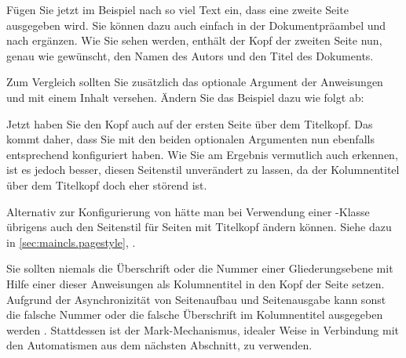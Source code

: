 \begin{Example}
  Fügen Sie jetzt im Beispiel nach  so viel
  Text ein, dass eine zweite Seite ausgegeben wird. Sie können dazu auch
  einfach  in der
  Dokumentpräambel und  nach
   ergänzen. Wie Sie sehen werden, enthält der
  Kopf der zweiten Seite nun, genau wie gewünscht, den Namen des Autors und
  den Titel des Dokuments.

  Zum Vergleich sollten Sie zusätzlich das optionale Argument der Anweisungen
   und  mit einem Inhalt versehen. Ändern Sie das
  Beispiel dazu wie folgt ab:
  Jetzt haben Sie den Kopf auch auf der ersten Seite 
  über dem Titelkopf. Das kommt daher, dass Sie mit den
  beiden optionalen Argumenten 
   nun ebenfalls
  entsprechend konfiguriert haben. Wie Sie am Ergebnis vermutlich auch
  erkennen, ist es jedoch besser, diesen Seitenstil unverändert zu lassen, da
  der Kolumnentitel über dem Titelkopf doch eher störend ist.

  Alternativ zur Konfigurierung von
   hätte man bei Verwendung
  einer \KOMAScript-Klasse übrigens auch den Seitenstil für Seiten mit
  Titelkopf ändern können. Siehe dazu %
   in \autoref{sec:maincls.pagestyle},
  .
\end{Example}

\iftrue%
\leavevmode{}%
\else Erlauben Sie mir einen wichtigen Hinweis:\textnote{Achtung!} %
\fi%
Sie sollten niemals die Überschrift oder die Nummer einer
Gliederungsebene mit Hilfe einer dieser Anweisungen als Kolumnentitel in den
Kopf der Seite setzen. Aufgrund der Asynchronizität von Seitenaufbau und
Seitenausgabe kann %
\iffalse%
es sonst leicht geschehen, dass die falsche Nummer oder die falsche
Überschrift im Kolumnentitel ausgegeben wird%
\else%
sonst die falsche Nummer oder die falsche Überschrift im Kolumnentitel
ausgegeben werden%
\fi%
. Stattdessen ist der Mark-Mechanismus, idealer Weise in Verbindung mit den
Automatismen aus dem nächsten Abschnitt, zu verwenden.%
\EndIndexGroup



